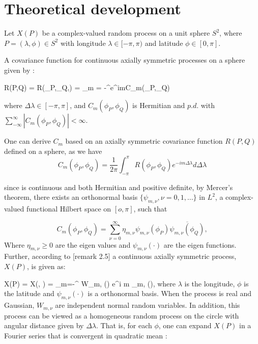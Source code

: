



\section{Theoretical development}

Let $X(P)$ be a complex-valued random process on a unit sphere $S^2$, where $P = (\lambda, \phi) \in S^2$ with longitude $\lambda \in [-\pi, \pi)$ and latitude $\phi \in [0, \pi]$.
	
	A covariance function for continuous axially symmetric processes on a sphere given by \cite[proposition 1]{Huang2012}:
	
	\beq 
	R(P,Q) = R(\phi_P,\phi_Q,\Delta\lambda) = \sum_{m = -\infty}^{\infty}e^{im\Delta\lambda}C_m(\phi_P,\phi_Q)
	\eeq
	
	where $\Delta\lambda \in [-\pi,\pi]$, and $C_m(\phi_P,\phi_Q)$ is Hermitian and $p.d.$ with $\sum_{-\infty}^{\infty}|C_m(\phi_P,\phi_Q)|<\infty$.
	
	One can derive $C_m$ based on an axially symmetric covariance function $R(P,Q)$ defined on a sphere, as we have
	\[ C_m(\phi_P, \phi_Q) = \frac{1}{2\pi}\int_{-\pi}^{\pi} R(\phi_P, \phi_Q)e^{-im\Delta\lambda} d\Delta\lambda \]
	
	since \Cm is continuous and both Hermitian and positive definite, by Mercer's theorem, there exists an orthonormal basis $\{\psi_{m,\nu}, \nu = 0,1,\ldots \}$ in $L^2$, a complex-valued functional Hilbert space on $[o,\pi ]$, such that
	
	\[ C_m(\phi_P,\phi_Q) = \sum_{\nu=0}^{\infty} \eta_{m,\nu}\psi_{m,\nu}(\phi_P)\overline{\psi_{m,\nu}(\phi_Q)},  \]
	Where $\eta_{m,\nu}\ge 0$ are the eigen values and $\psi_{m,\nu}(\cdot)$ are the eigen functions.\\
	
	Further, according to \cite{Huang2012}[remark 2.5] a continuous axially symmetric process, $X(P)$, is given as:
	
	\beq
	X(P) = X(\phi, \lambda) = \sum_{m=-\infty}^{\infty} W_{m, \nu}(\phi) e^{i m \lambda}\psi_{m,\nu} (\phi),
	\eeq
	where $\lambda$ is the longitude, $\phi$ is the latitude and $\psi_{m,\nu}(\cdot)$ is a orthonormal basis. When the process is real and Gaussian, $W_{m,\nu}$ are independent normal random variables. In addition, this process can be viewed as a homogeneous random process on the circle with angular distance given by $\Delta \lambda$. That is, for each $\phi$, one can expand $X(P)$ in a Fourier series that is convergent in quadratic mean \cite{Roy1972}:
	
